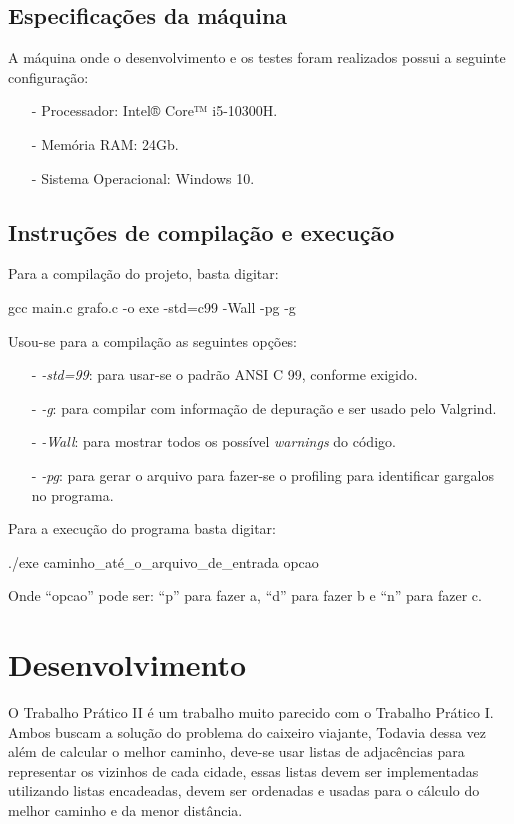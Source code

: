 \documentclass{article}
\begin{document}
\subsection{Especificações da máquina}
A máquina onde o desenvolvimento e os testes foram realizados possui a seguinte configuração:
\begin{itemize}
    \item[-] Processador:  Intel® Core™ i5-10300H.
    \item[-] Memória RAM: 24Gb.
    \item[-] Sistema Operacional: Windows 10.
\end{itemize}

\subsection{Instruções de compilação e execução}

Para a compilação do projeto, basta digitar:

\begin{tcolorbox}[title=Compilando o projeto,width=\linewidth]
    gcc main.c grafo.c -o exe -std=c99 -Wall -pg -g
\end{tcolorbox}

Usou-se para a compilação as seguintes opções:
\begin{itemize}
    \item [-] \emph{-std=99}: para usar-se o padrão ANSI C 99, conforme exigido.
    \item [-] \emph{-g}: para compilar com informação de depuração e ser usado pelo Valgrind.
    \item [-] \emph{-Wall}: para mostrar todos os possível \emph{warnings} do código.
    \item [-] \emph{-pg}: para gerar o arquivo para fazer-se o profiling para identificar gargalos no programa.
\end{itemize}

Para a execução do programa basta digitar:
\begin{tcolorbox}[title=,width=\linewidth]
    ./exe caminho\_até\_o\_arquivo\_de\_entrada opcao
\end{tcolorbox}

Onde ``opcao'' pode ser: ``p'' para fazer a, ``d'' para fazer b e ``n'' para fazer c.

\section{Desenvolvimento}
O Trabalho Prático II é um trabalho muito parecido com o Trabalho Prático I. Ambos buscam a solução do problema do caixeiro viajante, Todavia dessa vez além de calcular o melhor caminho, deve-se usar listas de adjacências para representar os vizinhos de cada cidade, essas listas devem ser implementadas utilizando listas encadeadas, devem ser ordenadas e usadas para o cálculo do melhor caminho e da menor distância. 
\end{document}
